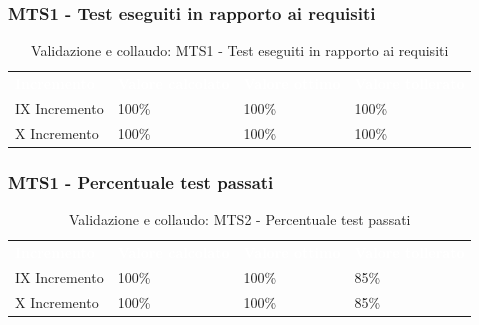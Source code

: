 \subsubsection{MTS1 - Test eseguiti in rapporto ai requisiti}
\begin{table}[H]
    \renewcommand{\arraystretch}{1.5}
    \begin{tabular}{ m{}<{\centering}  m{}<{\centering}  m{}<{\centering} m{}<{\centering} }
        \rowcolor{darkblue}
        \textcolor{white}{\textbf{Incremento}} &\textcolor{white}{\textbf{Valore calcolato}}& \textcolor{white}{\textbf{Valore ottimo}} & \textcolor{white}{\textbf{Valore tollerato}}\\ 
        
        IX Incremento & 
        100\% &
        100\% &
        100\% \\

        X Incremento & 
        100\% &
        100\% &
        100\% \\

    \end{tabular}
    \caption{Validazione e collaudo: MTS1 - Test eseguiti in rapporto ai requisiti}
\end{table}

\subsubsection{MTS1 - Percentuale test passati}
\begin{table}[H]
    \renewcommand{\arraystretch}{1.5}
    \begin{tabular}{ m{}<{\centering}  m{}<{\centering}  m{}<{\centering} m{}<{\centering} }
        \rowcolor{darkblue}
        \textcolor{white}{\textbf{Incremento}} &\textcolor{white}{\textbf{Valore calcolato}}& \textcolor{white}{\textbf{Valore ottimo}} & \textcolor{white}{\textbf{Valore tollerato}}\\ 
        
        IX Incremento & 
        100\% &
        100\% &
        85\% \\

        X Incremento & 
        100\% &
        100\% &
        85\% \\

    \end{tabular}
    \caption{Validazione e collaudo: MTS2 - Percentuale test passati}
\end{table}